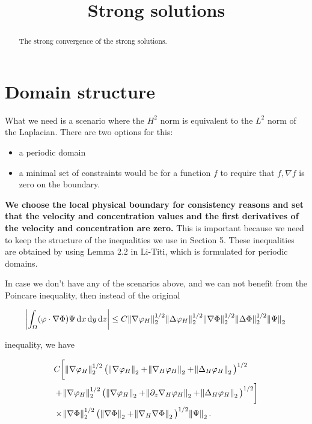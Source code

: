 \documentclass[11pt]{article}
\title{Strong solutions}
\date{}
\newcommand*\diff{\mathop{}\!\mathrm{d}}
\begin{document}
\maketitle

\begin{abstract}

The strong convergence of the strong solutions.

\end{abstract}

\newpage
\tableofcontents
\newpage

\section{Domain structure}

What we need is a scenario where the $H^2$ norm is equivalent to the $L^2$ norm of the Laplacian. There are two options for this:
\begin{itemize}
  \item a periodic domain
  \item a minimal set of constraints would be for a function $f$ to require that $f, \nabla f$ is zero on the boundary.
\end{itemize}

\textbf{We choose the local physical boundary for consistency reasons and set that the velocity and concentration values and the first derivatives of the velocity and concentration are zero.}
This is important because we need to keep the structure of the inequalities we use in Section 5. These inequalities are obtained by using Lemma 2.2 in Li-Titi, which is formulated for periodic domains.

In case we don't have any of the scenarios above, and we can not benefit from the Poincare inequality, then instead of the original

$$ \abs{\int_\Omega (\varphi \cdot \nabla \Phi) \Psi \diff x \diff y \diff z} \leq C \norm{\nabla \varphi_H}_2^{1/2} \norm{\Delta \varphi_H}_2^{1/2} \norm{\nabla \Phi}_2^{1/2} \norm{\Delta \Phi}_2^{1/2} \norm{\Psi}_2 $$

inequality, we have

\begin{equation}
  \begin{split}
    & C \bigg [ \norm{\nabla \varphi_H}_2^{1/2} \big ( \norm{\nabla \varphi_H}_2 + \norm{\nabla_H \varphi_H}_2 + \norm{\Delta_H \varphi_H}_2\big )^{1/2} \\
    & + \norm{\nabla \varphi_H}_2^{1/2} \big ( \norm{\nabla \varphi_H}_2 + \norm{\partial_z \nabla_H \varphi_H}_2 + \norm{\Delta_H \varphi_H}_2 \big )^{1/2} \bigg ] \\
    & \times \norm{\nabla \Phi}_2^{1/2}  \big ( \norm{\nabla \Phi}_2 + \norm{\nabla_H \nabla \Phi}_2 \big )^{1/2} \norm{\Psi}_2.
  \end{split}
\end{equation}
\end{document}
